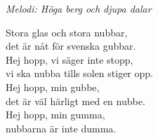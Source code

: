 {\footnotesize\textit{Melodi: Höga berg och djupa dalar }}\par
\vspace{10pt}
Stora glas och stora nubbar,\\
det är nåt för svenska gubbar.\\
Hej hopp, vi säger inte stopp,\\
vi ska nubba tills solen stiger opp.\\
Hej hopp, min gubbe,\\
det är väl härligt med en nubbe.\\
Hej hopp, min gumma,\\
nubbarna är inte dumma.